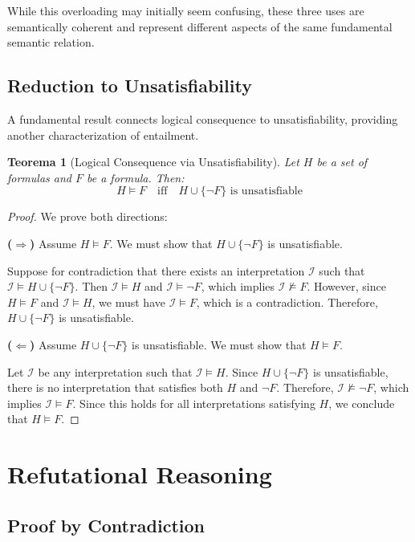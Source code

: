\documentclass[11pt,a4paper]{article}
\theoremstyle{definition}
\theoremstyle{plain}
\newtheorem{theorem}{Teorema}[section]
\theoremstyle{remark}
\begin{document}
While this overloading may initially seem confusing, these three uses are semantically coherent and represent different aspects of the same fundamental semantic relation.

\subsection{Reduction to Unsatisfiability}

A fundamental result connects logical consequence to unsatisfiability, providing another characterization of entailment.

\begin{theorem}[Logical Consequence via Unsatisfiability]
Let $H$ be a set of formulas and $F$ be a formula. Then:
\[
H \models F \quad \text{iff} \quad H \cup \{\neg F\} \text{ is unsatisfiable}
\]
\end{theorem}

\begin{proof}
We prove both directions:

\textbf{($\Rightarrow$)} Assume $H \models F$. We must show that $H \cup \{\neg F\}$ is unsatisfiable.

Suppose for contradiction that there exists an interpretation $\mathcal{I}$ such that $\mathcal{I} \models H \cup \{\neg F\}$. Then $\mathcal{I} \models H$ and $\mathcal{I} \models \neg F$, which implies $\mathcal{I} \not\models F$. However, since $H \models F$ and $\mathcal{I} \models H$, we must have $\mathcal{I} \models F$, which is a contradiction. Therefore, $H \cup \{\neg F\}$ is unsatisfiable.

\textbf{($\Leftarrow$)} Assume $H \cup \{\neg F\}$ is unsatisfiable. We must show that $H \models F$.

Let $\mathcal{I}$ be any interpretation such that $\mathcal{I} \models H$. Since $H \cup \{\neg F\}$ is unsatisfiable, there is no interpretation that satisfies both $H$ and $\neg F$. Therefore, $\mathcal{I} \not\models \neg F$, which implies $\mathcal{I} \models F$. Since this holds for all interpretations satisfying $H$, we conclude that $H \models F$.
\end{proof}

\section{Refutational Reasoning}

\subsection{Proof by Contradiction}
\end{document}
